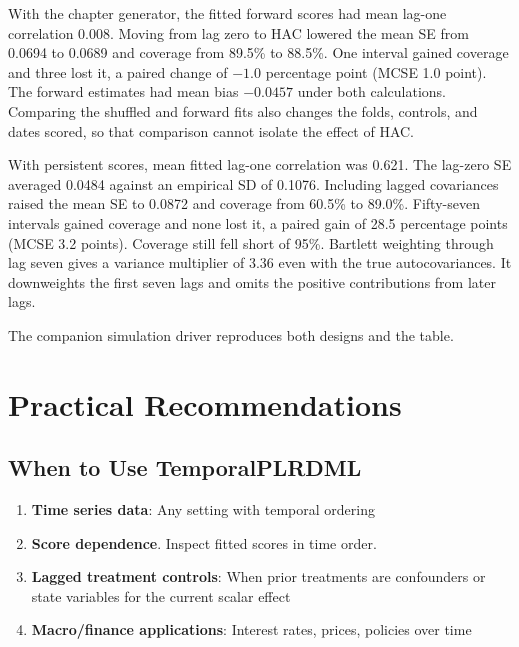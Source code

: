 With the chapter generator, the fitted forward scores had mean lag-one correlation 0.008. Moving from lag zero to HAC lowered the mean SE from 0.0694 to 0.0689 and coverage from 89.5\% to 88.5\%. One interval gained coverage and three lost it, a paired change of $-1.0$ percentage point (MCSE 1.0 point). The forward estimates had mean bias $-0.0457$ under both calculations. Comparing the shuffled and forward fits also changes the folds, controls, and dates scored, so that comparison cannot isolate the effect of HAC.

With persistent scores, mean fitted lag-one correlation was 0.621. The lag-zero SE averaged 0.0484 against an empirical SD of 0.1076. Including lagged covariances raised the mean SE to 0.0872 and coverage from 60.5\% to 89.0\%. Fifty-seven intervals gained coverage and none lost it, a paired gain of 28.5 percentage points (MCSE 3.2 points). Coverage still fell short of 95\%. Bartlett weighting through lag seven gives a variance multiplier of 3.36 even with the true autocovariances. It downweights the first seven lags and omits the positive contributions from later lags.

The companion simulation driver reproduces both designs and the table.


\section{Practical Recommendations}\label{sec:recommendations}

\subsection{When to Use TemporalPLRDML}

\begin{enumerate}
    \item \textbf{Time series data}: Any setting with temporal ordering
    \item \textbf{Score dependence}. Inspect fitted scores in time order.
    \item \textbf{Lagged treatment controls}: When prior treatments are confounders or state variables for the current scalar effect
    \item \textbf{Macro/finance applications}: Interest rates, prices, policies over time
\end{enumerate}

